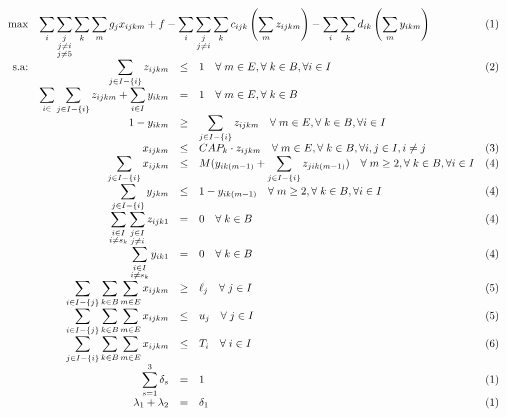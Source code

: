 \documentclass[a4paper,oneside,12pt]{amsart}
\def \ds{\displaystyle}
\begin{document}
\[
\begin{array}{rrclr}
     \max &  \multicolumn{3}{l}{\ds\sum_{i}\sum_{\substack{j \\ j\neq i \\ j\neq 5}}\sum_{k}\sum_{m}g_jx_{ijkm} + f - \ds\sum_{i}\sum_{\substack{j \\ j\neq i}}\sum_{k}c_{ijk}\left(\sum_{m}z_{ijkm}\right) - \ds\sum_{i}\sum_k d_{ik}\left(\sum_{m}y_{ikm}\right) } & (1) \\
     \text{s.a:} & \ds\sum_{j\in I-\{i\}}z_{ijkm} & \leq & 1 \quad \forall\;m\in E, \forall\;k\in B, \forall i\in I  & (2) \\ 
     & \ds\sum_{i\in}\ds\sum_{j\in I-\{i\}}z_{ijkm} + \ds\sum_{i\in I}y_{ikm} & = & 1 \quad \forall\;m\in E, \forall\;k\in B  & \\
     & 1- y_{ikm} & \geq & \ds\sum_{j\in I-\{i\}}z_{ijkm} \quad \forall\;m\in E, \forall\;k\in B, \forall i\in I  & \\
      & x_{ijkm} & \leq & CAP_k\cdot z_{ijkm} \quad \forall\;m\in E, \forall\;k\in B, \forall i,j\in I, i\neq j  & (3) \\ 
     & \ds\sum_{j\in I-\{i\}} x_{ijkm} & \leq & M(y_{ik(m-1)} + \ds\sum_{j\in I-\{i\}}z_{jik(m-1)})\quad \forall\;m\geq 2, \forall\;k\in B, \forall i\in I  & (4) \\
     & \ds\sum_{j\in I-\{i\}} y_{jkm} & \leq & 1-y_{ik(m-1)}\quad \forall\;m\geq 2, \forall\;k\in B, \forall i\in I  & (4) \\
     & \ds\sum_{\substack{i \in I \\ i \neq s_k}}\sum_{\substack{j\in I \\ j\neq i} } z_{ijk1} & = & 0 \quad \forall\;k\in B & (4) \\
     & \ds\sum_{\substack{i \in I \\ i \neq s_k}} y_{ik1} & = & 0 \quad  \forall\;k\in B & (4) \\
     & \ds\sum_{i\in I-\{j\}}\sum_{k\in B}\sum_{m\in E} x_{ijkm} & \geq & \ell_j \quad \forall\; j\in I & (5)\\
     & \ds\sum_{i\in I-\{j\}}\sum_{k\in B}\sum_{m\in E} x_{ijkm} & \leq & u_j \quad \forall\; j\in I & (5)\\
     & \ds\sum_{j\in I-\{i\}}\sum_{k\in B}\sum_{m\in E} x_{ijkm} & \leq & T_i \quad \forall\; i\in I & (6)\\
     & \ds\sum_{s=1}^3 \delta_s & = & 1 &  (1) \\
     & \lambda_1 + \lambda_2 & = & \delta_1 &  (1) \\

\end{array}\]
\end{document}
